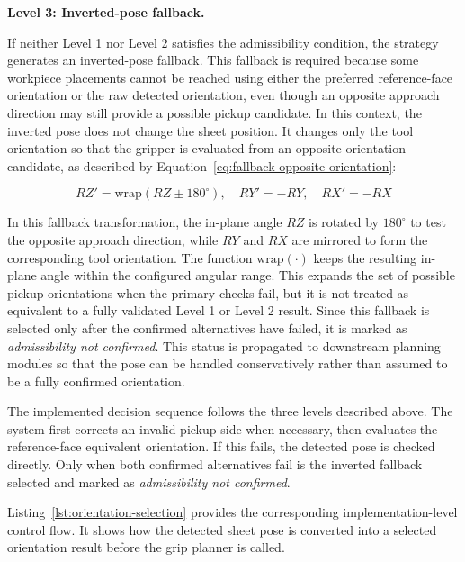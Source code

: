 \noindent\textbf{Level 3: Inverted-pose fallback.}

If neither Level 1 nor Level 2 satisfies the admissibility condition, the strategy generates an inverted-pose fallback. This fallback is required because some workpiece placements cannot be reached using either the preferred reference-face orientation or the raw detected orientation, even though an opposite approach direction may still provide a possible pickup candidate. In this context, the inverted pose does not change the sheet position. It changes only the tool orientation so that the gripper is evaluated from an opposite orientation candidate, as described by Equation~\ref{eq:fallback-opposite-orientation}:

\begin{equation}
RZ' = \mathrm{wrap}(RZ \pm 180^\circ), \quad
RY' = -RY, \quad
RX' = -RX
\label{eq:fallback-opposite-orientation}
\end{equation}

In this fallback transformation, the in-plane angle $RZ$ is rotated by $180^\circ$ to test the opposite approach direction, while $RY$ and $RX$ are mirrored to form the corresponding tool orientation. The function $\mathrm{wrap}(\cdot)$ keeps the resulting in-plane angle within the configured angular range. This expands the set of possible pickup orientations when the primary checks fail, but it is not treated as equivalent to a fully validated Level 1 or Level 2 result. Since this fallback is selected only after the confirmed alternatives have failed, it is marked as \textit{admissibility not confirmed}. This status is propagated to downstream planning modules so that the pose can be handled conservatively rather than assumed to be a fully confirmed orientation.

The implemented decision sequence follows the three levels described above. The system first corrects an invalid pickup side when necessary, then evaluates the reference-face equivalent orientation. If this fails, the detected pose is checked directly. Only when both confirmed alternatives fail is the inverted fallback selected and marked as \textit{admissibility not confirmed}.

Listing~\ref{lst:orientation-selection} provides the corresponding implementation-level control flow. It shows how the detected sheet pose is converted into a selected orientation result before the grip planner is called.



